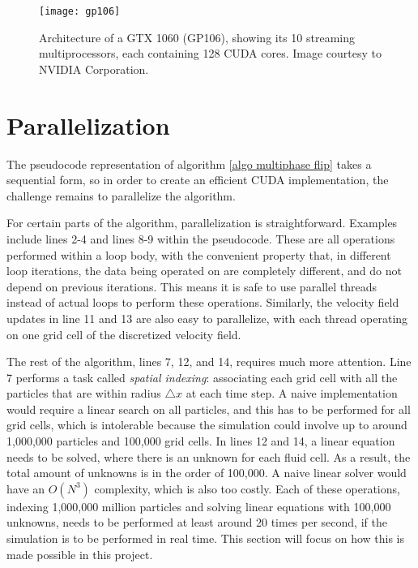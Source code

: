 \begin{figure}[H]
    \centering
    \texttt{[image: gp106]}
    \caption{Architecture of a GTX 1060 (GP106), showing its 10 streaming multiprocessors, each containing 128 CUDA cores. Image courtesy to NVIDIA Corporation.}
    \label{figure GTX1060}
\end{figure}



\section{Parallelization}
The pseudocode representation of algorithm \ref{algo multiphase flip} takes a sequential form, so in order to create an efficient CUDA implementation, the challenge remains to parallelize the algorithm.

For certain parts of the algorithm, parallelization is straightforward. Examples include lines 2-4 and lines 8-9 within the pseudocode. These are all operations performed within a loop body, with the convenient property that, in different loop iterations, the data being operated on are completely different, and do not depend on previous iterations. This means it is safe to use parallel threads instead of actual loops to perform these operations. Similarly, the velocity field updates in line 11 and 13 are also easy to parallelize, with each thread operating on one grid cell of the discretized velocity field. 

The rest of the algorithm, lines 7, 12, and 14, requires much more attention. Line 7 performs a task called \textit{spatial indexing}: associating each grid cell with all the particles that are within radius $\triangle x$ at each time step. A naive implementation would require a linear search on all particles, and this has to be performed for all grid cells, which is intolerable because the simulation could involve up to around 1,000,000 particles and 100,000 grid cells. In lines 12 and 14, a linear equation needs to be solved, where there is an unknown for each fluid cell. As a result, the total amount of unknowns is in the order of 100,000. A naive linear solver would have an $O(N^3)$ complexity, which is also too costly. Each of these operations, indexing 1,000,000 million particles and solving linear equations with 100,000 unknowns, needs to be performed at least around 20 times per second, if the simulation is to be performed in real time. This section will focus on how this is made possible in this project.

